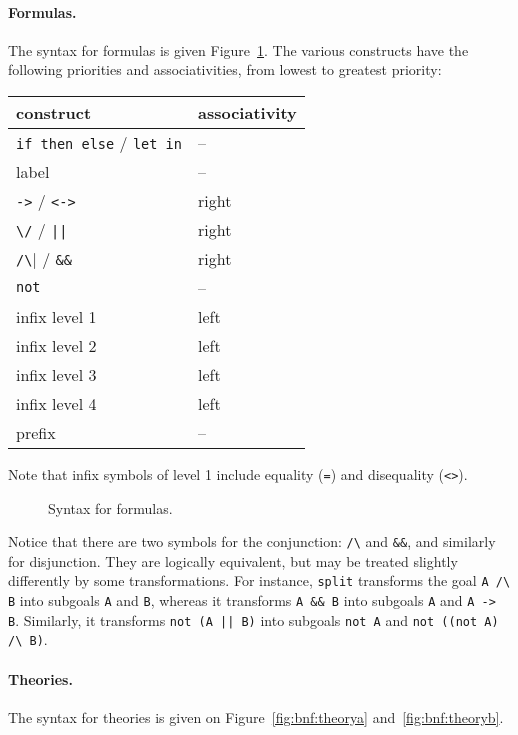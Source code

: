 \paragraph{Formulas.}
The syntax for formulas is given Figure~\ref{fig:bnf:formula}.
The various constructs have the following priorities and
associativities, from lowest to greatest priority:
\begin{center}
  \begin{tabular}{|l|l|}
    \hline
    construct & associativity \\
    \hline\hline
    \texttt{if then else} / \texttt{let in} & -- \\
    label & -- \\
    \texttt{->} / \texttt{<->} & right \\
    \verb!\/! / \verb!||! & right \\
    \verb|/\| / \verb!&&! & right \\
    \texttt{not}  & -- \\
    infix level 1 & left \\
    infix level 2 & left \\
    infix level 3 & left \\
    infix level 4 & left \\
    prefix        & --   \\
    \hline
  \end{tabular}
\end{center}
Note that infix symbols of level 1 include equality (\texttt{=}) and
disequality (\texttt{<>}).

\begin{figure}
  \begin{center}\framebox{}\end{center}
  \caption{Syntax for formulas.}
\label{fig:bnf:formula}
\end{figure}

Notice that there are two symbols for the conjunction: \verb|/\|
and \verb|&&|, and similarly for disjunction. They are logically
equivalent, but may be treated slightly differently by some
transformations. For instance, \texttt{split} transforms the goal
\verb|A /\ B| into subgoals \verb|A| and \verb|B|, whereas it transforms
\verb|A && B| into subgoals \verb|A| and \verb|A -> B|. Similarly, it
transforms \verb!not (A || B)! into subgoals \verb|not A| and
\verb|not ((not A) /\ B)|.

\paragraph{Theories.}
The syntax for theories is given on Figure~\ref{fig:bnf:theorya} and~\ref{fig:bnf:theoryb}.

